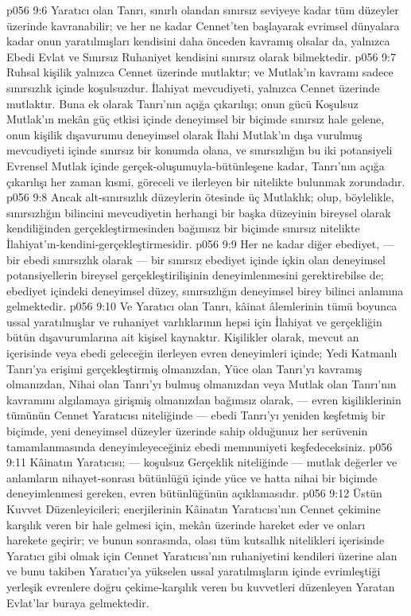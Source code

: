 \vs p056 9:6 Yaratıcı olan Tanrı, sınırlı olandan sınırsız seviyeye kadar tüm düzeyler üzerinde kavranabilir; ve her ne kadar Cennet’ten başlayarak evrimsel dünyalara kadar onun yaratılmışları kendisini daha önceden kavramış olsalar da, yalnızca Ebedi Evlat ve Sınırsız Ruhaniyet kendisini sınırsız olarak bilmektedir.
\vs p056 9:7 Ruhsal kişilik yalnızca Cennet üzerinde mutlaktır; ve Mutlak’ın kavramı sadece sınırsızlık içinde koşulsuzdur. İlahiyat mevcudiyeti, yalnızca Cennet üzerinde mutlaktır. Buna ek olarak Tanrı’nın açığa çıkarılışı; onun gücü Koşulsuz Mutlak’ın mekân güç etkisi içinde deneyimsel bir biçimde sınırsız hale gelene, onun kişilik dışavurumu deneyimsel olarak İlahi Mutlak’ın dışa vurulmuş mevcudiyeti içinde sınırsız bir konumda olana, ve sınırsızlığın bu iki potansiyeli Evrensel Mutlak içinde gerçek\hyp{}oluşumuyla\hyp{}bütünleşene kadar, Tanrı’nın açığa çıkarılışı her zaman kısmi, göreceli ve ilerleyen bir nitelikte bulunmak zorundadır.
\vs p056 9:8 Ancak alt\hyp{}sınırsızlık düzeylerin ötesinde üç Mutlaklık;  olup, böylelikle, sınırsızlığın bilincini mevcudiyetin herhangi bir başka düzeyinin bireysel olarak kendiliğinden gerçekleştirmesinden bağımsız bir biçimde sınırsız nitelikte İlahiyat’ın\hyp{}kendini\hyp{}gerçekleştirmesidir.
\vs p056 9:9 Her ne kadar diğer ebediyet, --- bir ebedi sınırsızlık olarak --- bir sınırsız ebediyet içinde içkin olan deneyimsel potansiyellerin bireysel gerçekleştirilişinin deneyimlenmesini gerektirebilse de; ebediyet içindeki deneyimsel düzey, sınırsızlığın deneyimsel birey bilinci anlamına gelmektedir.
\vs p056 9:10 Ve Yaratıcı olan Tanrı, kâinat âlemlerinin tümü boyunca ussal yaratılmışlar ve ruhaniyet varlıklarının hepsi için İlahiyat ve gerçekliğin bütün dışavurumlarına ait kişisel kaynaktır. Kişilikler olarak, mevcut an içerisinde veya ebedi geleceğin ilerleyen evren deneyimleri içinde; Yedi Katmanlı Tanrı’ya erişimi gerçekleştirmiş olmanızdan, Yüce olan Tanrı’yı kavramış olmanızdan, Nihai olan Tanrı’yı bulmuş olmanızdan veya Mutlak olan Tanrı’nın kavramını algılamaya girişmiş olmanızdan bağımsız olarak, --- evren kişiliklerinin tümünün Cennet Yaratıcısı niteliğinde --- ebedi Tanrı’yı yeniden keşfetmiş bir biçimde, yeni deneyimsel düzeyler üzerinde sahip olduğunuz her serüvenin tamamlanmasında deneyimleyeceğiniz ebedi memnuniyeti keşfedeceksiniz.
\vs p056 9:11 Kâinatın Yaratıcısı; --- koşulsuz Gerçeklik niteliğinde --- mutlak değerler ve anlamların nihayet\hyp{}sonrası bütünlüğü içinde yüce ve hatta nihai bir biçimde deneyimlenmesi gereken, evren bütünlüğünün açıklamasıdır.
\vs p056 9:12 Üstün Kuvvet Düzenleyicileri; enerjilerinin Kâinatın Yaratıcısı’nın Cennet çekimine karşılık veren bir hale gelmesi için, mekân üzerinde hareket eder ve onları harekete geçirir; ve bunun sonrasında, olası tüm kutsallık nitelikleri içerisinde Yaratıcı gibi olmak için Cennet Yaratıcısı’nın ruhaniyetini kendileri üzerine alan ve bunu takiben Yaratıcı’ya yükselen ussal yaratılmışların içinde evrimleştiği yerleşik evrenlere doğru çekime\hyp{}karşılık veren bu kuvvetleri düzenleyen Yaratan Evlat’lar buraya gelmektedir.
